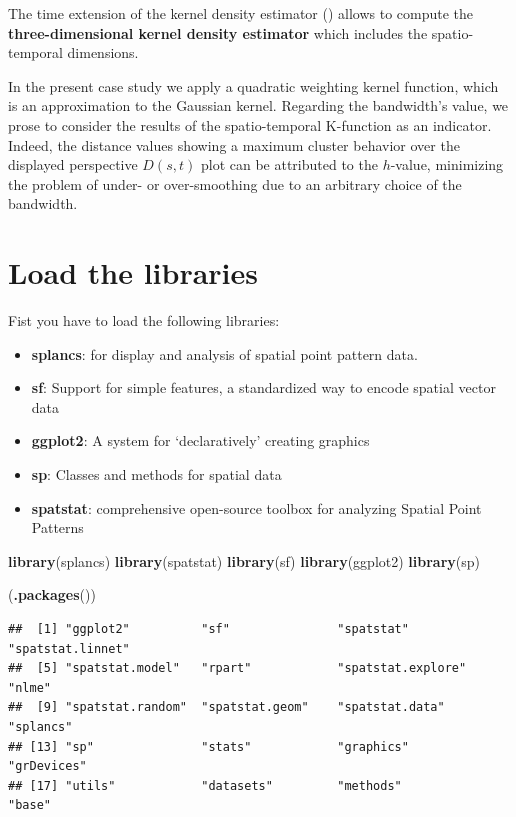 \documentclass[
]{book}
\newenvironment{Shaded}{\begin{snugshade}}{\end{snugshade}}
\newcommand{\FunctionTok}[1]{\textcolor[rgb]{0.13,0.29,0.53}{\textbf{#1}}}
\newcommand{\NormalTok}[1]{#1}
\providecommand{\tightlist}{%
  \setlength{\itemsep}{0pt}\setlength{\parskip}{0pt}}
\begin{document}
The time extension of the kernel density estimator (\citet{nakaya_visualising_2010}) allows to compute the \textbf{three-dimensional kernel density estimator} which includes the spatio-temporal dimensions.

In the present case study we apply a quadratic weighting kernel function, which is an approximation to the Gaussian kernel.
Regarding the bandwidth's value, we prose to consider the results of the spatio-temporal K-function as an indicator.
Indeed, the distance values showing a maximum cluster behavior over the displayed perspective \(D(s,t)\) plot can be attributed to the \(h\)-value, minimizing the problem of under- or over-smoothing due to an arbitrary choice of the bandwidth.

\hypertarget{load-the-libraries-1}{%
\section{Load the libraries}\label{load-the-libraries-1}}

Fist you have to load the following libraries:

\begin{itemize}
\tightlist
\item
  \textbf{splancs}: for display and analysis of spatial point pattern data.
\item
  \textbf{sf}: Support for simple features, a standardized way to encode spatial vector data
\item
  \textbf{ggplot2}: A system for `declaratively' creating graphics
\item
  \textbf{sp}: Classes and methods for spatial data
\item
  \textbf{spatstat}: comprehensive open-source toolbox for analyzing Spatial Point Patterns
\end{itemize}

\begin{Shaded}
\begin{Highlighting}[]
\FunctionTok{library}\NormalTok{(splancs)}
\FunctionTok{library}\NormalTok{(spatstat)}
\FunctionTok{library}\NormalTok{(sf)}
\FunctionTok{library}\NormalTok{(ggplot2)}
\FunctionTok{library}\NormalTok{(sp)}

\NormalTok{(}\FunctionTok{.packages}\NormalTok{())}
\end{Highlighting}
\end{Shaded}

\begin{verbatim}
##  [1] "ggplot2"          "sf"               "spatstat"         "spatstat.linnet" 
##  [5] "spatstat.model"   "rpart"            "spatstat.explore" "nlme"            
##  [9] "spatstat.random"  "spatstat.geom"    "spatstat.data"    "splancs"         
## [13] "sp"               "stats"            "graphics"         "grDevices"       
## [17] "utils"            "datasets"         "methods"          "base"
\end{verbatim}
\end{document}
